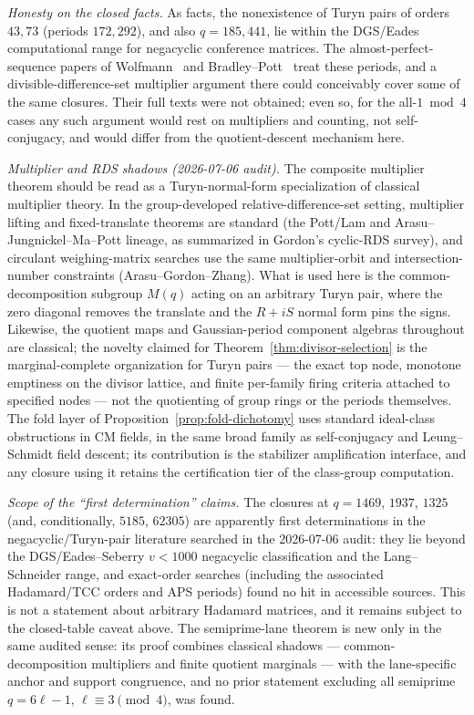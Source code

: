 \documentclass[11pt]{article}
\theoremstyle{plain}
\theoremstyle{definition}
\theoremstyle{remark}
\begin{document}
\emph{Honesty on the closed facts.} As facts, the nonexistence of Turyn pairs of
orders $43,73$ (periods $172,292$), and also $q=185,441$, lie within the
DGS/Eades computational range for negacyclic conference matrices. The
almost-perfect-sequence papers of Wolfmann~\cite{Wolfmann92} and
Bradley--Pott~\cite{PB95} treat these periods, and a divisible-difference-set
multiplier argument there could conceivably cover some of the same closures.
Their full texts were not obtained; even so, for the all-$1\bmod4$ cases any
such argument would rest on multipliers and counting, not self-conjugacy, and
would differ from the quotient-descent mechanism here.

\emph{Multiplier and RDS shadows (2026-07-06 audit).}  The composite
multiplier theorem should be read as a Turyn-normal-form specialization
of classical multiplier theory.  In the group-developed
relative-difference-set setting, multiplier lifting and fixed-translate
theorems are standard (the Pott/Lam and Arasu--Jungnickel--Ma--Pott
lineage, as summarized in Gordon's cyclic-RDS survey), and circulant
weighing-matrix searches use the same multiplier-orbit and
intersection-number constraints (Arasu--Gordon--Zhang).  What is used
here is the common-decomposition subgroup $M(q)$ acting on an arbitrary
Turyn pair, where the zero diagonal removes the translate and the
$R+iS$ normal form pins the signs.  Likewise, the quotient maps and
Gaussian-period component algebras throughout are classical; the
novelty claimed for Theorem~\ref{thm:divisor-selection} is the
marginal-complete organization for Turyn pairs --- the exact top node,
monotone emptiness on the divisor lattice, and finite per-family firing
criteria attached to specified nodes --- not the quotienting of group
rings or the periods themselves.  The fold layer of
Proposition~\ref{prop:fold-dichotomy} uses standard ideal-class
obstructions in CM fields, in the same broad family as self-conjugacy
and Leung--Schmidt field descent; its contribution is the stabilizer
amplification interface, and any closure using it retains the
certification tier of the class-group computation.

\emph{Scope of the ``first determination'' claims.}  The closures at
$q=1469$, $1937$, $1325$ (and, conditionally, $5185$, $62305$) are
apparently first determinations in the negacyclic/Turyn-pair literature
searched in the 2026-07-06 audit: they lie beyond the
DGS/Eades--Seberry $v<1000$ negacyclic classification and the
Lang--Schneider range, and exact-order searches (including the
associated Hadamard/TCC orders and APS periods) found no hit in
accessible sources.  This is not a statement about arbitrary Hadamard
matrices, and it remains subject to the closed-table caveat above.  The
semiprime-lane theorem is new only in the same audited sense: its proof
combines classical shadows --- common-decomposition multipliers and
finite quotient marginals --- with the lane-specific anchor and support
congruence, and no prior statement excluding all semiprime $q=6\ell-1$,
$\ell\equiv3\pmod4$, was found.
\end{document}
